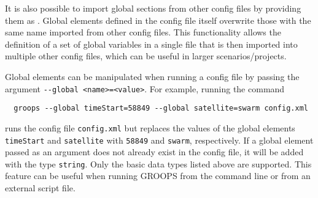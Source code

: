 It is also possible to import global sections from other config files by providing them as .
Global elements defined in the config file itself overwrite those with the same name imported from other config files.
This functionality allows the definition of a set of global variables in a single file that is then imported into multiple
other config files, which can be useful in larger scenarios/projects.

Global elements can be manipulated when running a config file by passing the argument \verb|--global <name>=<value>|.
For example, running the command
\begin{verbatim}
  groops --global timeStart=58849 --global satellite=swarm config.xml
\end{verbatim}
runs the config file \verb|config.xml| but replaces the values of the global elements \verb|timeStart|
and \verb|satellite| with \verb|58849| and \verb|swarm|, respectively. If a global element passed as
an argument does not already exist in the config file, it will be added with the type \verb|string|.
Only the basic data types listed above are supported. This feature can be useful when running GROOPS
from the command line or from an external script file.
